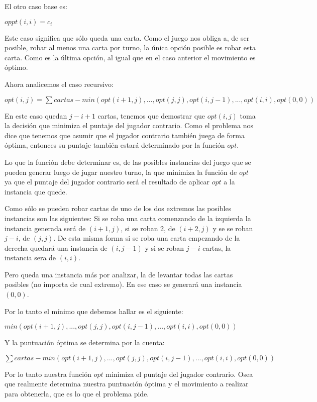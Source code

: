 El otro caso base es:

$oppt(i,i) = c_i$

Este caso significa que sólo queda una carta. Como el juego nos obliga a, de ser posible, robar al menos una carta por turno, la única opción posible es robar esta carta. Como es la última opción, al igual que en el caso anterior el movimiento es óptimo.

Ahora analicemos el caso recursivo:

$opt(i,j) = \sum cartas - min(opt(i+1, j), ..., opt(j,j), opt(i, j-1), ... ,opt(i,i), opt(0,0))$

En este caso quedan $j-i+1$ cartas, tenemos que demostrar que $opt(i,j)$ toma la decisión que minimiza el puntaje del jugador contrario. Como el problema nos dice que tenemos que asumir que el jugador contrario también juega de forma óptima, entonces su puntaje también estará determinado por la función $opt$.

Lo que la función debe determinar es, de las posibles instancias del juego que se pueden generar luego de jugar nuestro turno, la que minimiza la función de $opt$ ya que el puntaje del jugador contrario será el resultado de aplicar $opt$ a la instancia que quede.

Como sólo se pueden robar cartas de uno de los dos extremos las posibles instancias son las siguientes: Si se roba una carta comenzando de la izquierda la instancia generada será de $(i+1,j)$, si se roban 2, de $(i+2,j)$ y se se roban $j-i$, de $(j,j)$. De esta misma forma si se roba una carta empezando de la derecha quedará una instancia de $(i,j-1)$ y si se roban $j-i$ cartas, la instancia sera de $(i,i)$.

Pero queda una instancia más por analizar, la de levantar todas las cartas posibles (no importa de cual extremo). En ese caso se generará una instancia $(0,0)$.

Por lo tanto el mínimo que debemos hallar es el siguiente:

$min(opt(i+1,j), ... , opt(j,j), opt(i,j-1), ... , opt(i,i), opt(0,0))$

Y la puntuación óptima se determina por la cuenta:

$\sum cartas - min(opt(i+1,j), ... , opt(j,j), opt(i,j-1), ... , opt(i,i), opt(0,0))$

Por lo tanto nuestra función $opt$ minimiza el puntaje del jugador contrario. Osea que realmente determina nuestra puntuación óptima y el movimiento a realizar para obtenerla, que es lo que el problema pide.

